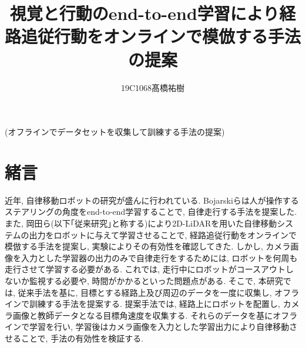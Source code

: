 \documentclass[10pt]{ujarticle}
\begin{document}
    
    \makeatletter
    \title{視覚と行動のend-to-end学習により経路追従行動をオンラインで模倣する手法の提案}{(オフラインでデータセットを収集して訓練する手法の提案)}
    
    \author{19C1068\hspace{.5zw}髙橋祐樹}
    
    \makeatother
    
    
    
    \maketitle
    
    
    \section{緒\hspace{2zw}言}%
    近年, 自律移動ロボットの研究が盛んに行われている. Bojarskiら\cite{bojarski}は人が操作するステアリングの角度をend-to-end学習することで, 自律走行する手法を提案した. また, 岡田ら\cite{si2020-okada}\cite{si2021-okada}(以下｢従来研究｣と称する)により2D-LiDARを用いた自律移動システムの出力をロボットに与えて学習させることで, 経路追従行動をオンラインで模倣する手法を提案し, 実験によりその有効性を確認してきた. しかし, カメラ画像を入力とした学習器の出力のみで自律走行をするためには, ロボットを何周も走行させて学習する必要がある. これでは, 走行中にロボットがコースアウトしないか監視する必要や, 時間がかかるといった問題点がある. そこで, 本研究では, 従来手法を基に, 目標とする経路上及び周辺のデータを一度に収集し, オフラインで訓練する手法を提案する. 提案手法では, 経路上にロボットを配置し, カメラ画像と教師データとなる目標角速度を収集する. それらのデータを基にオフラインで学習を行い, 学習後はカメラ画像を入力とした学習出力により自律移動させることで, 手法の有効性を検証する. 
\end{document}
